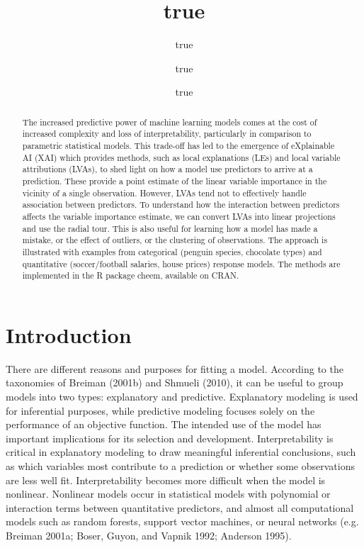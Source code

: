\documentclass[
]{article}
\title{true}
\author{true \and true \and true}
\date{}
\begin{document}
\maketitle
\begin{abstract}
The increased predictive power of machine learning models comes at the cost of increased complexity and loss of interpretability, particularly in comparison to parametric statistical models. This trade-off has led to the emergence of eXplainable AI (XAI) which provides methods, such as local explanations (LEs) and local variable attributions (LVAs), to shed light on how a model use predictors to arrive at a prediction. These provide a point estimate of the linear variable importance in the vicinity of a single observation. However, LVAs tend not to effectively handle association between predictors. To understand how the interaction between predictors affects the variable importance estimate, we can convert LVAs into linear projections and use the radial tour. This is also useful for learning how a model has made a mistake, or the effect of outliers, or the clustering of observations. The approach is illustrated with examples from categorical (penguin species, chocolate types) and quantitative (soccer/football salaries, house prices) response models. The methods are implemented in the R package cheem, available on CRAN.
\end{abstract}

{
\setcounter{tocdepth}{2}
\tableofcontents
}
\hypertarget{sec:intro}{%
\section{Introduction}\label{sec:intro}}

There are different reasons and purposes for fitting a model. According to the taxonomies of Breiman (2001b) and Shmueli (2010), it can be useful to group models into two types: explanatory and predictive. Explanatory modeling is used for inferential purposes, while predictive modeling focuses solely on the performance of an objective function. The intended use of the model has important implications for its selection and development. Interpretability is critical in explanatory modeling to draw meaningful inferential conclusions, such as which variables most contribute to a prediction or whether some observations are less well fit. Interpretability becomes more difficult when the model is nonlinear. Nonlinear models occur in statistical models with polynomial or interaction terms between quantitative predictors, and almost all computational models such as random forests, support vector machines, or neural networks (e.g. Breiman 2001a; Boser, Guyon, and Vapnik 1992; Anderson 1995).
\end{document}
